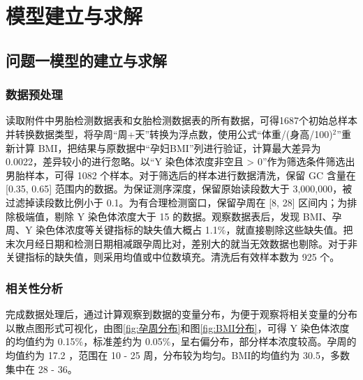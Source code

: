 \documentclass[withoutpreface,bwprint]{cumcmthesis} %
\begin{document}
\section{模型建立与求解}
\subsection{问题一模型的建立与求解}
\subsubsection{数据预处理}
读取附件中男胎检测数据表和女胎检测数据表的所有数据，可得1687个初始总样本并转换数据类型，将孕周“周+天”转换为浮点数，使用公式“体重/(身高/100)$^2$”重新计算 BMI，把结果与原数据中“孕妇BMI”列进行验证，计算最大差异为0.0022，差异较小的进行忽略。以“Y 染色体浓度非空且 > 0”作为筛选条件筛选出男胎样本，可得 1082 个样本。对于筛选后的样本进行数据清洗，保留 GC 含量在 [0.35, 0.65] 范围内的数据。为保证测序深度，保留原始读段数大于 3,000,000，被过滤掉读段数比例小于 0.1。为有合理检测窗口，保留孕周在 [8, 28] 区间内；为排除极端值，剔除 Y 染色体浓度大于 15 的数据。观察数据表后，发现 BMI、孕周、Y 染色体浓度等关键指标的缺失值大概占 1.1\%，就直接剔除这些缺失值。把末次月经日期和检测日期相减跟孕周比对，差别大的就当无效数据也剔除。对于非关键指标的缺失值，则采用均值或中位数填充。清洗后有效样本数为 925 个。

\subsubsection{相关性分析}
完成数据处理后，通过计算观察到数据的变量分布，为便于观察将相关变量的分布以散点图形式可视化，由图\ref{fig:孕周分布}和图\ref{fig:BMI分布}，可得 Y 染色体浓度的均值约为 0.15\%，标准差约为 0.05\%，呈右偏分布，部分样本浓度较高。孕周的均值约为 17.2 ，范围在 10 - 25 周，分布较为均匀。BMI的均值约为 30.5，多数集中在 28 - 36。
\end{document}
